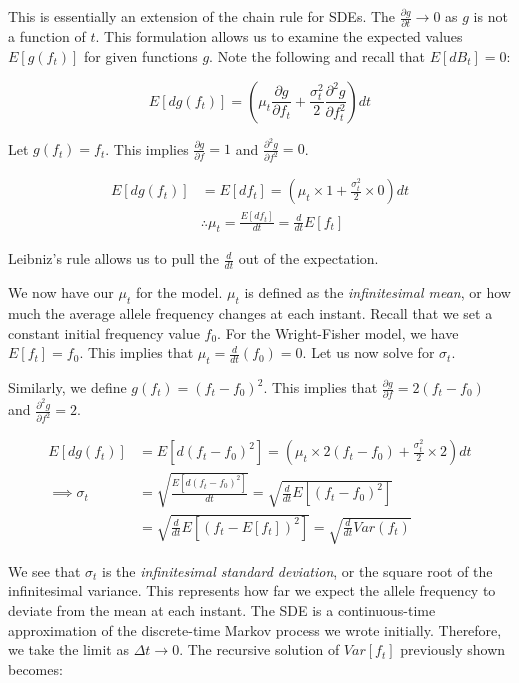 This is essentially an extension of the chain rule for SDEs. The $\frac{\partial g}{\partial t} \to 0$ as $g$ is not a function of $t$. This formulation allows us to examine the expected values $E[g(f_t)]$ for given functions $g$. Note the following and recall that $E[dB_t] = 0$:

\begin{equation}
    E[dg(f_t)] = (\mu_t \frac{\partial g}{\partial f_t} + \frac{\sigma_t^2}{2} \frac{\partial^2 g}{\partial f_t^2})dt
\end{equation}


Let $g(f_t) = f_t$. This implies $\frac{\partial g}{\partial f} = 1$ and $\frac{\partial^2 g}{\partial f^2} = 0$.


\begin{equation}
    \begin{split}
         E[dg(f_t)] &= E[df_t] = (\mu_t \times 1 + \frac{\sigma_t^2}{2} \times 0)dt \\
         & \therefore \mu_t = \frac{E[df_t]}{dt} = \frac{d}{dt}E[f_t]
    \end{split}
\end{equation}


Leibniz's rule allows us to pull the $\frac{d}{dt}$ out of the expectation. 


We now have our $\mu_t$ for the model. $\mu_t$ is defined as the \textit{infinitesimal mean}, or how much the average allele frequency changes at each instant. Recall that we set a constant initial frequency value $f_0$. For the Wright-Fisher model, we have $E[f_t] = f_0$. This implies that $\mu_t = \frac{d}{dt} (f_0) = 0$. Let us now solve for $\sigma_t$.


Similarly, we define $g(f_t) = (f_t - f_0)^2$. This implies that $\frac {\partial g}{\partial f} = 2(f_t - f_0)$ and $\frac{\partial^2 g}{\partial f^2} = 2$.


\begin{equation}
    \begin{split}
         E[dg(f_t)] &= E[d(f_t-f_0)^2] = (\mu_t \times 2(f_t - f_0) + \frac{\sigma_t^2}{2} \times 2)dt \\
         \implies \sigma_t &= \sqrt{\frac{E[d(f_t-f_0)^2]}{dt}} = \sqrt{\frac{d}{dt}E[(f_t-f_0)^2]} \\
         &= \sqrt{\frac{d}{dt}E[(f_t-E[f_t])^2]} = \sqrt{\frac{d}{dt}Var(f_t)}
    \end{split}
\end{equation}


We see that $\sigma_t$ is the \textit{infinitesimal standard deviation}, or the square root of the infinitesimal variance. This represents how far we expect the allele frequency to deviate from the mean at each instant. The SDE is a continuous-time approximation of the discrete-time Markov process we wrote initially. Therefore, we take the limit as $\Delta t \to 0$. The recursive solution of $Var[f_t]$ previously shown becomes:

